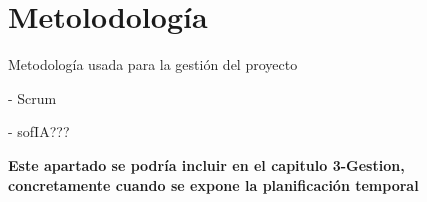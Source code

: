 \chapter{Metolodología}\label{cap:metodologia}

Metodología usada para la gestión del proyecto

- Scrum

- sofIA???

\textbf{Este apartado se podría incluir en el capitulo 3-Gestion, concretamente cuando se expone la planificación temporal}